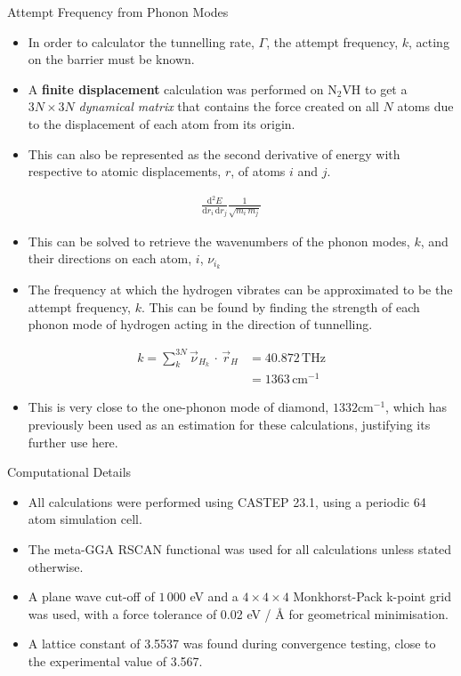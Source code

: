 \documentclass[final]{beamer}
\renewcommand{\d}{\textrm{d}}
\newlength{\colwidth}
\begin{document}
\begin{frame}[t]
\begin{columns}[t]
\begin{column}{\colwidth}
\begin{block}{Attempt Frequency from Phonon Modes}
\begin{itemize}
    \item In order to calculator the tunnelling rate, $\Gamma$, the attempt frequency, $k$, acting on the barrier must be known.
    \item A \textbf{finite displacement} calculation was performed on N$_2$VH to get a $3N\times3N$ \emph{dynamical matrix} that contains the force created on all $N$ atoms due to the displacement of each atom from its origin.
    \item This can also be represented as the second derivative of energy with respective to atomic displacements, $r$,  of atoms $i$ and $j$.
\end{itemize}
    \begin{align*}
        \frac{{\d}^2E}{{\d}r_i\,{\d}r_j}\frac{1}{\sqrt{m_i\,m_j}}
    \end{align*}
    \begin{itemize}
        \item This can be solved to retrieve the wavenumbers of the phonon modes, $k$, and their directions on each atom, $i$, $\nu_i_k$
        \item The frequency at which the hydrogen vibrates can be approximated to be the attempt frequency, $k$. This can be found by finding the strength of each phonon mode of hydrogen acting in the direction of tunnelling.
    \end{itemize}
    \begin{align*}
        k = \sum_k^{3N} \Vec{\nu}_H_k\, \cdot\, \Vec{r}_H &= 40.872\,\textrm{THz}\\
        &= 1363\,\textrm{cm}^{-1}
    \end{align*}
    \begin{itemize}
        \item This is very close to the one-phonon mode of diamond, $1332$cm$^{-1}$, which has previously been used as an estimation for these calculations, justifying its further use here.
    \end{itemize}
    

  \end{block}

  \begin{exampleblock}{Computational Details} %
    \begin{itemize}
        \item All calculations were performed using CASTEP 23.1, using a periodic 64 atom simulation cell.
        \item The meta-GGA RSCAN functional was used for all calculations unless stated otherwise. 
        \item A plane wave cut-off of $1\,000$ eV and a $4\times 4\times 4$ Monkhorst-Pack k-point grid was used, with a force tolerance of 0.02 eV / {\AA} for geometrical minimisation.
        \item A lattice constant of 3.5537 was found during convergence testing, close to the experimental value of 3.567.
    \end{itemize}


\end{exampleblock}
\end{column}
\end{columns}
\end{frame}
\end{document}
